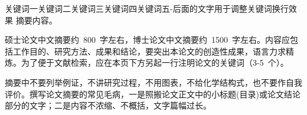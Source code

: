 
\begin{abstractCN}{关键词一}{关键词二}{关键词三}{关键词四}{关键词五-后面的文字用于调整关键词换行效果}
	摘要内容。
	
	硕士论文中文摘要约~800~字左右，博士论文中文摘要约~1500~字左右。内容应包括工作目的、研究方法、成果和结论，要突出本论文的创造性成果，语言力求精炼。为了便于文献检索，应在本页下方另起一行注明论文的关键词（3-5~个）。
	
	摘要中不要列举例证，不讲研究过程，不用图表，不给化学结构式，也不要作自我评价。撰写论文摘要的常见毛病，一是照搬论文正文中的小标题(目录)或论文结论部分的文字；二是内容不浓缩、不概括，文字篇幅过长\cite{zhaiyao}。
\end{abstractCN}